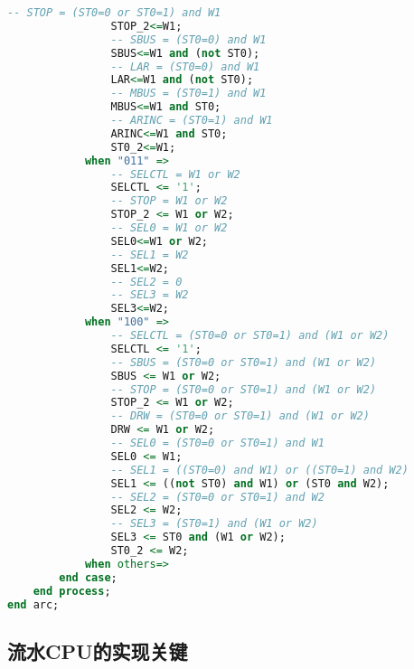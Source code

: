 \documentclass[UTF8]{ctexart}
\begin{document}
{\begin{lstlisting}[language={VHDL}]
				-- STOP = (ST0=0 or ST0=1) and W1
				STOP_2<=W1;
				-- SBUS = (ST0=0) and W1
				SBUS<=W1 and (not ST0);
				-- LAR = (ST0=0) and W1
				LAR<=W1 and (not ST0);
				-- MBUS = (ST0=1) and W1
				MBUS<=W1 and ST0;
				-- ARINC = (ST0=1) and W1
				ARINC<=W1 and ST0;
				ST0_2<=W1;
			when "011" =>
				-- SELCTL = W1 or W2
				SELCTL <= '1';
				-- STOP = W1 or W2
				STOP_2 <= W1 or W2;
				-- SEL0 = W1 or W2
				SEL0<=W1 or W2;
				-- SEL1 = W2
				SEL1<=W2;
				-- SEL2 = 0
				-- SEL3 = W2
				SEL3<=W2;
			when "100" =>
				-- SELCTL = (ST0=0 or ST0=1) and (W1 or W2)
				SELCTL <= '1';
				-- SBUS = (ST0=0 or ST0=1) and (W1 or W2)
				SBUS <= W1 or W2;
				-- STOP = (ST0=0 or ST0=1) and (W1 or W2)
				STOP_2 <= W1 or W2;
				-- DRW = (ST0=0 or ST0=1) and (W1 or W2)
				DRW <= W1 or W2;
				-- SEL0 = (ST0=0 or ST0=1) and W1
				SEL0 <= W1;
				-- SEL1 = ((ST0=0) and W1) or ((ST0=1) and W2)
				SEL1 <= ((not ST0) and W1) or (ST0 and W2);
				-- SEL2 = (ST0=0 or ST0=1) and W2
				SEL2 <= W2;
				-- SEL3 = (ST0=1) and (W1 or W2) 
				SEL3 <= ST0 and (W1 or W2);
				ST0_2 <= W2;
			when others=>
		end case;
	end process;
end arc;
\end{lstlisting}
}
\subsection{流水CPU的实现关键}
\begin{figure}[!ht]
	\centering
\end{figure}
\end{document}
